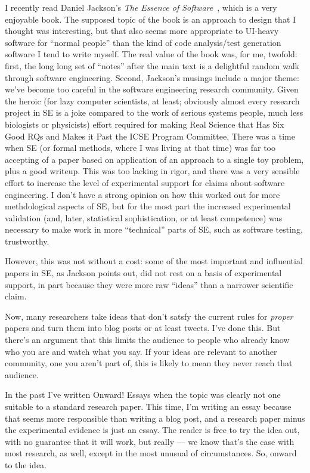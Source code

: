 \documentclass[sigplan,screen]{acmart}
\begin{document}
I recently read Daniel Jackson's \emph{The Essence of Software}~\cite{essence}, which
is a very enjoyable book.  The supposed topic of the book is an
approach to design that I thought was interesting, but that also seems
more appropriate to UI-heavy software for ``normal people'' than the
kind of code analysis/test generation software I tend to write
myself.  The real value of the book was, for me, twofold:  first, the
long long set of ``notes'' after the main text is a delightful random
walk through software engineering.  Second, Jackson's musings include
a major theme:  we've become too careful in the software engineering
research community.  Given the heroic (for lazy computer scientists,
at least;
obviously almost every research project in SE is a joke compared to
the work of serious systems people, much less biologists or
physicists) effort required for making Real Science that Has Six Good
RQs and Makes it Past the ICSE Program Committee,   There was a time
when SE (or formal methods, where I was living at that time) was far
too accepting of a paper based on application of an approach to a
single toy problem, plus a good writeup.  This was too lacking in
rigor, and there was a very sensible effort to increase the level of
experimental support for claims about software engineering.  I don't
have a strong opinion on how this worked out for more methdological
aspects of SE, but for the most part the increased experimental
validation (and, later, statistical sophistication, or at least competence) was necessary to
make work in more ``technical'' parts of SE, such as software testing,
trustworthy.

However, this was not without a cost:  some of the most important and
influential papers in SE, as Jackson points out, did not rest on a
basis of experimental support, in part because they were more raw
``ideas'' than a narrower scientific claim.

Now, many researchers take ideas that don't satsfy the current rules
for \emph{proper} papers and turn them into blog posts or at least
tweets.  I've done this.  But there's an argument that this limits the
audience to people who already know who you are and watch what you
say.  If your ideas are relevant to another community, one you aren't
part of, this is likely to mean they never reach that audience.

In the past I've written Onward! Essays when the topic was clearly not
one suitable to a standard research paper.  This time, I'm writing an
essay because that seems more responsible than writing a blog post,
and a research paper minus the experimental evidence is just an
essay.  The reader is free to try the idea out, with no guarantee that
it will work, but really --- we know that's the case with most
research, as well, except in the most unusual of circumstances.  So,
onward to the idea.
\end{document}
